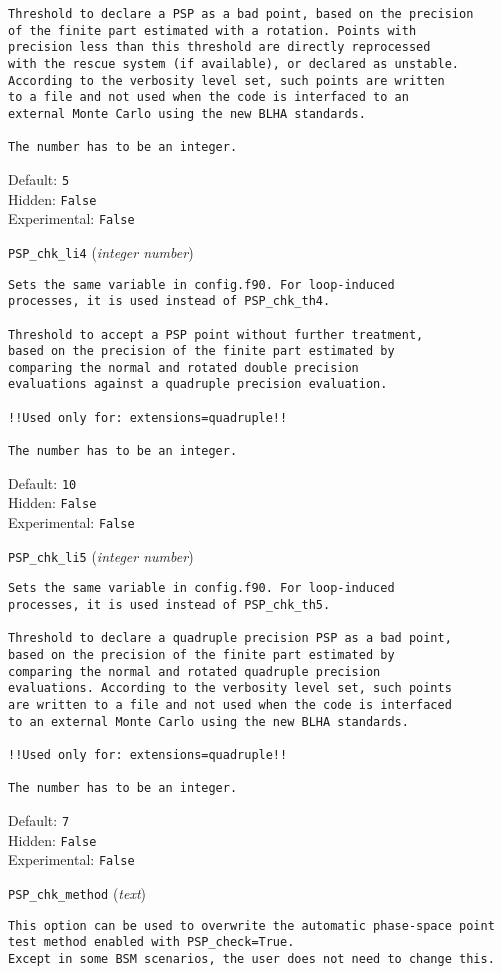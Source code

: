\begin{basedescript}{\desclabelstyle{\pushlabel}}
\begin{verbatim}
Threshold to declare a PSP as a bad point, based on the precision
of the finite part estimated with a rotation. Points with
precision less than this threshold are directly reprocessed
with the rescue system (if available), or declared as unstable.
According to the verbosity level set, such points are written
to a file and not used when the code is interfaced to an
external Monte Carlo using the new BLHA standards.

The number has to be an integer.
\end{verbatim}
Default: \verb|5|
\\Hidden: \verb|False|
\\Experimental: \verb|False|
\\\item[\colorbox{gray!30}{\texttt{PSP\_chk\_li4}}] (\textit{integer number})
\begin{verbatim}
Sets the same variable in config.f90. For loop-induced
processes, it is used instead of PSP_chk_th4.

Threshold to accept a PSP point without further treatment,
based on the precision of the finite part estimated by
comparing the normal and rotated double precision
evaluations against a quadruple precision evaluation.

!!Used only for: extensions=quadruple!!

The number has to be an integer.
\end{verbatim}
Default: \verb|10|
\\Hidden: \verb|False|
\\Experimental: \verb|False|
\\\item[\colorbox{gray!30}{\texttt{PSP\_chk\_li5}}] (\textit{integer number})
\begin{verbatim}
Sets the same variable in config.f90. For loop-induced
processes, it is used instead of PSP_chk_th5.

Threshold to declare a quadruple precision PSP as a bad point,
based on the precision of the finite part estimated by
comparing the normal and rotated quadruple precision
evaluations. According to the verbosity level set, such points
are written to a file and not used when the code is interfaced
to an external Monte Carlo using the new BLHA standards.

!!Used only for: extensions=quadruple!!

The number has to be an integer.
\end{verbatim}
Default: \verb|7|
\\Hidden: \verb|False|
\\Experimental: \verb|False|
\\\item[\colorbox{gray!30}{\texttt{PSP\_chk\_method}}] (\textit{text})
\begin{verbatim}
This option can be used to overwrite the automatic phase-space point
test method enabled with PSP_check=True.
Except in some BSM scenarios, the user does not need to change this.


\end{verbatim}
\end{basedescript}
